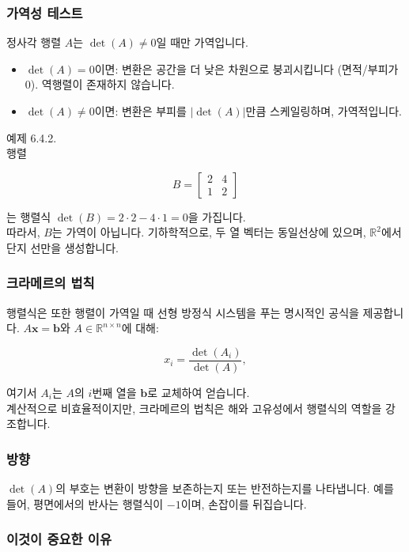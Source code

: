 \documentclass[
  12pt,
  a4paper,
]{article}
\begin{document}
\subsubsection{가역성 테스트}\label{invertibility-test}

정사각 행렬 \(A\)는 \(\det(A) \neq 0\)일 때만 가역입니다.

\begin{itemize}
\item
  \(\det(A) = 0\)이면: 변환은 공간을 더 낮은 차원으로 붕괴시킵니다 (면적/부피가 0). 역행렬이 존재하지 않습니다.
\item
  \(\det(A) \neq 0\)이면: 변환은 부피를 \(|\det(A)|\)만큼 스케일링하며, 가역적입니다.
\end{itemize}

예제 6.4.2.\\
행렬

\[B = \begin{bmatrix} 2 & 4 \\ 1 & 2 \end{bmatrix}\]

는 행렬식 \(\det(B) = 2 \cdot 2 - 4 \cdot 1 = 0\)을 가집니다.\\
따라서, \(B\)는 가역이 아닙니다. 기하학적으로, 두 열 벡터는 동일선상에 있으며, \(\mathbb{R}^2\)에서 단지 선만을 생성합니다.

\subsubsection{크라메르의 법칙}\label{cramers-rule}

행렬식은 또한 행렬이 가역일 때 선형 방정식 시스템을 푸는 명시적인 공식을 제공합니다. \(A\mathbf{x} = \mathbf{b}\)와 \(A \in \mathbb{R}^{n \times n}\)에 대해:

\[x_i = \frac{\det(A_i)}{\det(A)},\]

여기서 \(A_i\)는 \(A\)의 \(i\)번째 열을 \(\mathbf{b}\)로 교체하여 얻습니다.\\
계산적으로 비효율적이지만, 크라메르의 법칙은 해와 고유성에서 행렬식의 역할을 강조합니다.

\subsubsection{방향}\label{orientation}

\(\det(A)\)의 부호는 변환이 방향을 보존하는지 또는 반전하는지를 나타냅니다. 예를 들어, 평면에서의 반사는 행렬식이 \(-1\)이며, 손잡이를 뒤집습니다.

\subsubsection{이것이 중요한 이유}\label{why-this-matters-23}
\end{document}
